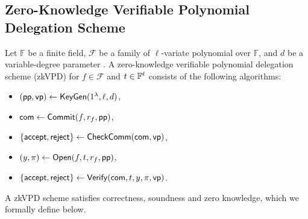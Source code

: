 
\subsection{Zero-Knowledge Verifiable Polynomial Delegation Scheme}
\label{subsec::zkvpd}

Let $\mathbb{F}$ be a finite field, $\mathcal{F}$ be a family of $\ell$-variate polynomial over $\mathbb{F}$, and $d$ be a variable-degree parameter . A zero-knowledge verifiable polynomial delegation scheme (zkVPD) for $f\in\mathcal{F}$ and $t\in\mathbb{F}^\ell$ consists of the following algorithms: 
\begin{itemize}
    \item $(\mathsf{pp}, \mathsf{vp}) \leftarrow \mathsf{KeyGen}(1^\lambda, \ell, d)$,
    \item ${{\sf com}} \leftarrow \mathsf{Commit}(f, r_f, \mathsf{pp})$,
    \item $\{\mathsf{accept},\mathsf{reject}\}\leftarrow\mathsf{CheckComm}({{\sf com}}, \mathsf{vp})$,
    \item $(y,\pi)\leftarrow\mathsf{Open}(f,t,r_f,\mathsf{pp})$,
    \item $\{\mathsf{accept},\mathsf{reject}\}\leftarrow\mathsf{Verify}({{\sf com}},t,y,\pi,\mathsf{vp})$.
\end{itemize}    
A zkVPD scheme satisfies correctness, soundness and zero knowledge, which we formally define below.


